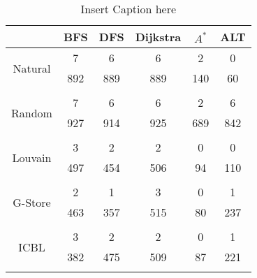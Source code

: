 \begin{table}
	\begin{center}
		 \begin{tabular}[c]{c c c c c c} \toprule
			  & BFS & DFS & Dijkstra & $A^*$  & ALT \\ \midrule 
 			\multirow{2}{*}{Natural}  & 7 & 6 & 6 & 2 & 0 \\ 
 				 & 892 & 889 & 889 & 140 & 60 \\ 
 				&&&&& \\[-0.5em]
 			\multirow{2}{*}{Random}  & 7 & 6 & 6 & 2 & 6 \\ 
 				 & 927 & 914 & 925 & 689 & 842 \\ 
 				&&&&& \\[-0.5em]
 			\multirow{2}{*}{Louvain}  & 3 & 2 & 2 & 0 & 0 \\ 
 				 & 497 & 454 & 506 & 94 & 110 \\ 
 				&&&&& \\[-0.5em]
 			\multirow{2}{*}{G-Store}  & 2 & 1 & 3 & 0 & 1 \\ 
 				 & 463 & 357 & 515 & 80 & 237 \\ 
 				&&&&& \\[-0.5em]
 			\multirow{2}{*}{ICBL}  & 3 & 2 & 2 & 0 & 1 \\ 
 				 & 382 & 475 & 509 & 87 & 221 \\ 
 				&&&&& \\[-0.5em]
 					\end{tabular}  
  	 \end{center}
	 \caption{ Insert Caption here}
\end{table}